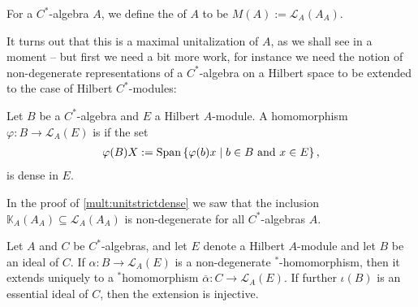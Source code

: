 \begin{definition}
	For a $C^*$-algebra $A$, we define the  of $A$ to be $M(A):=\mathcal{L}_A(A_A)$.
\end{definition}
It turns out that this is a maximal unitalization of $A$, as we shall see in a moment -- but first we need a bit more work, for instance we need the notion of non-degenerate representations of a $C^*$-algebra on a Hilbert space to be extended to the case of Hilbert $C^*$-modules:
\begin{definition}
	Let $B$ be a $C^*$-algebra and $E$ a Hilbert $A$-module. A homomorphism $\varphi \colon B \to \mathcal{L}_A(E)$ is  if the set
	\begin{align*}
		\varphi(B)X:= \mathrm{Span}\left\{ \varphi(b)x \mid b \in B  \text{ and } x \in E \right\},
	\end{align*}
	is dense in $E$. 
\end{definition}
\begin{example}
	In the proof of \ref{mult:unitstrictdense} we saw that the inclusion $\mathbb{K}_A(A_A) \subseteq \mathcal{L}_A(A_A)$ is non-degenerate for all $C^*$-algebras $A$.
	\label{mult:compnondeg}
\end{example}
\begin{proposition}
	Let $A$ and $C$ be $C^*$-algebras, and let $E$ denote a Hilbert $A$-module and let $B$ be an ideal of $C$. If $\alpha \colon B \to \mathcal{L}_A(E)$ is a non-degenerate  $^*$-homomorphism, then it extends uniquely to a $^*$homomorphism $\overline \alpha \colon C \to \mathcal{L}_A(E)$. If further $\iota(B)$ is an essential ideal of $C$, then the extension is injective. 
	\label{mult:uniqueext}
\end{proposition}
